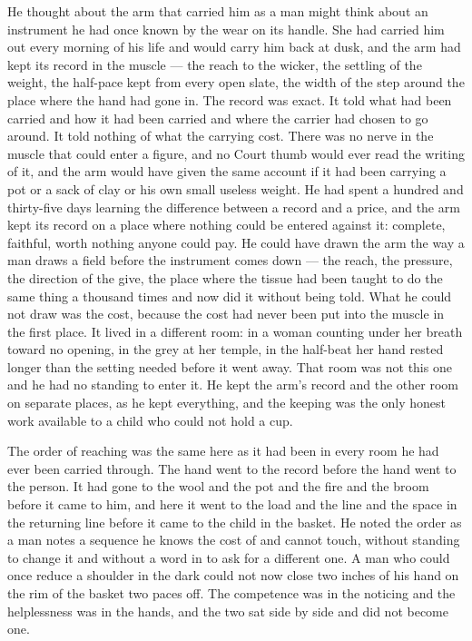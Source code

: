He thought about the arm that carried him as a man might think about an instrument he had once known by the wear on its handle. She had carried him out every morning of his life and would carry him back at dusk, and the arm had kept its record in the muscle --- the reach to the wicker, the settling of the weight, the half-pace kept from every open slate, the width of the step around the place where the hand had gone in. The record was exact. It told what had been carried and how it had been carried and where the carrier had chosen to go around. It told nothing of what the carrying cost. There was no nerve in the muscle that could enter a figure, and no Court thumb would ever read the writing of it, and the arm would have given the same account if it had been carrying a pot or a sack of clay or his own small useless weight. He had spent a hundred and thirty-five days learning the difference between a record and a price, and the arm kept its record on a place where nothing could be entered against it: complete, faithful, worth nothing anyone could pay. He could have drawn the arm the way a man draws a field before the instrument comes down --- the reach, the pressure, the direction of the give, the place where the tissue had been taught to do the same thing a thousand times and now did it without being told. What he could not draw was the cost, because the cost had never been put into the muscle in the first place. It lived in a different room: in a woman counting under her breath toward no opening, in the grey at her temple, in the half-beat her hand rested longer than the setting needed before it went away. That room was not this one and he had no standing to enter it. He kept the arm's record and the other room on separate places, as he kept everything, and the keeping was the only honest work available to a child who could not hold a cup.

The order of reaching was the same here as it had been in every room he had ever been carried through. The hand went to the record before the hand went to the person. It had gone to the wool and the pot and the fire and the broom before it came to him, and here it went to the load and the line and the space in the returning line before it came to the child in the basket. He noted the order as a man notes a sequence he knows the cost of and cannot touch, without standing to change it and without a word in  to ask for a different one. A man who could once reduce a shoulder in the dark could not now close two inches of his hand on the rim of the basket two paces off. The competence was in the noticing and the helplessness was in the hands, and the two sat side by side and did not become one.

